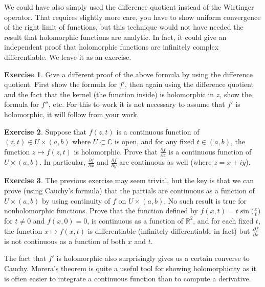 \documentclass[12pt,openany]{book}
\newcommand{\C}{{\mathbb{C}}}
\newcommand{\R}{{\mathbb{R}}}
\theoremstyle{plain}
\theoremstyle{remark}
\theoremstyle{definition}
\newenvironment{exbox}{%
    \def\FrameCommand{\vrule width 1pt \relax\hspace{10pt}}%
    \MakeFramed{\advance\hsize-\width\FrameRestore}%
}{%
    \endMakeFramed
}
\theoremstyle{exercise}
\newtheorem{exercise}{Exercise}[section]
\theoremstyle{example}
\begin{document}
We could have also simply used the difference quotient instead of the
Wirtinger operator.  That requires slightly more care, you have to show
uniform convergence of the right limit of functions, but this technique
would not have needed the result
that holomorphic functions are analytic.  In fact,
it could give an independent proof that holomorphic functions are infinitely
complex differentiable.
We leave it as an exercise.

\begin{exbox}
\begin{exercise}
Give a different proof of the above formula by using the difference
quotient.  First show the formula for $f'$, then again using the difference
quotient and the fact that the kernel (the function inside) is holomorphic
in $z$, show the formula for $f''$, etc.  For this to work it is
not necessary to assume that $f'$ is holomorphic, it will follow from your
work.
\end{exercise}

\begin{exercise} \label{exercise:partialderscont}
Suppose that $f(z,t)$ is a continuous function of $(z,t) \in U \times (a,b)$
where $U \subset \C$ is open, and for any fixed $t \in (a,b)$, the function
$z \mapsto f(z,t)$ is holomorphic.  Prove that
$\frac{\partial f}{\partial z}$ is a continuous function of $U \times
(a,b)$.  In particular,
$\frac{\partial f}{\partial x}$
and
$\frac{\partial f}{\partial y}$ are continuous as well (where $z=x+iy$).
\end{exercise}

\begin{exercise}
The previous exercise may seem trivial, but the key is that we can prove
(using Cauchy's formula) that the partials are continuous as a function of
$U \times (a,b)$ by using continuity of $f$ on $U \times (a,b)$.  No such
result is true for nonholomorphic functions.  Prove that the function defined by
$f(x,t) = t \sin\bigl(\frac{x}{t}\bigr)$ for $t \not= 0$ and $f(x,0) =  0$,
is continuous as a function of $\R^2$, and for each fixed $t$, the function
$x \mapsto f(x,t)$ is differentiable (infinitely differentiable in fact)
but $\frac{\partial f}{\partial x}$ is not continuous as a function of both
$x$ and $t$.
\end{exercise}
\end{exbox}

The fact that $f'$ is holomorphic also surprisingly gives us a
certain converse to Cauchy.
Morera's theorem is quite a useful tool for showing
holomorphicity as it is often easier to integrate a continuous
function than to compute a derivative.
\end{document}
